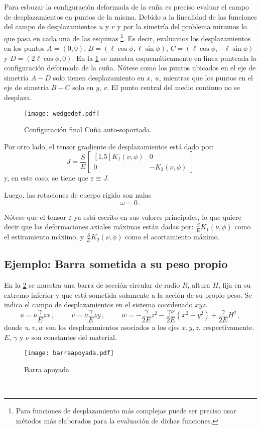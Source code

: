 \documentclass[../notas medios.tex]{subfiles}
\begin{document}
Para esbozar la configuración deformada de la cuña es preciso evaluar el campo 
de desplazamientos en puntos de la misma. Debido a la linealidad de las 
funciones del campo de desplazamientos $u$ y $v$ y por la simetría del 
problema miramos lo que pasa en cada una de las esquinas
\footnote{Para funciones de desplazamiento más complejas puede ser preciso usar 
métodos más elaborados para la evaluación de dichas funciones.}. Es decir, 
evaluamos los desplazamientos en los puntos $A = (0,0)$,  $B = (\ell \cos\phi, 
\ell \sin\phi)$, $C = (\ell \cos\phi, -\ell \sin\phi)$ y $D = (2\ell 
\cos\phi,0)$. En la \cref{wedgedef} se muestra esquemáticamente en linea 
punteada la configuración deformada de la cuña. Nótese  como los puntos 
ubicados en el eje de simetría $A-D$ solo tienen desplazamiento en $x$, $u$, 
mientras que los puntos en el eje de simetría $B-C$ solo en $y$, $v$. El punto 
central del medio continuo no se desplaza. 
\begin{figure}[H]
\centering
	\texttt{[image: wedgedef.pdf]}
	\caption{Configuración final Cuña auto-soportada.}
	\label{wedgedef}
\end{figure}

Por otro lado, el tensor gradiente de desplazamientos está dado por: 
\[J = \frac{S}{E}\begin{bmatrix}[1.5]
K_1(\nu, \phi) &0\\
0 &-K_2(\nu, \phi)
\end{bmatrix}\]
y, en este caso, se tiene que \(\varepsilon  \equiv J\).

Luego, las rotaciones de cuerpo rígido son nulas
\[\omega  = 0\, .\]

Nótese que el tensor $\varepsilon$ ya está escrito en sus valores principales, 
lo que quiere decir que las deformaciones axiales máximas están dadas por: 
$\frac{S}{E} K_1(\nu, \phi)$ como el estiramiento máximo, y $\frac{S}{E} 
K_2(\nu, \phi)$ como el acortamiento máximo.

\subsection{Ejemplo: Barra sometida a su peso propio}

En la  \cref{BarApo} se muestra una barra de sección circular de radio $R$, 
altura $H$, fija en su extremo inferior y que está sometida solamente a la 
acción de su propio peso. Se indica el campo de desplazamientos en el sistema 
coordenado $xyz$.
\begin{equation*}	
	u = \nu \dfrac{\gamma}{E} z x\, ,
	\hspace{1cm}
	v = \nu \dfrac{\gamma}{E} z y\, ,
	\hspace{1cm}
	w = -\dfrac{\gamma}{2E} z^2 - \dfrac{\gamma \nu}{2E} 
	(x^2+y^2)+\dfrac{\gamma}{2E} H^2\, , 
\end{equation*}
donde $u,v,w$ son los desplazamientos asociados a los ejes $x,y,z$,  
respectivamente. $E$, $\gamma$ y $\nu$ son constantes del material.	
\begin{figure}[h]
	\centering
	\texttt{[image: barraapoyada.pdf]}
	\caption{Barra apoyada}
	 \label{BarApo}
\end{figure}\\
\end{document}
